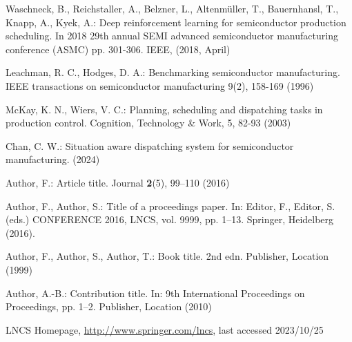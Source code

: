 \begin{thebibliography}{8}
	Waschneck, B., Reichstaller, A., Belzner, L., Altenmüller, T., Bauernhansl, T., Knapp, A., Kyek, A.: Deep reinforcement learning for semiconductor production scheduling. In 2018 29th annual SEMI advanced semiconductor manufacturing conference (ASMC) pp. 301-306. IEEE, (2018, April)
	
	Leachman, R. C., Hodges, D. A.: Benchmarking semiconductor manufacturing. IEEE transactions on semiconductor manufacturing 9(2), 158-169 (1996)
	
	McKay, K. N., Wiers, V. C.: Planning, scheduling and dispatching tasks in production control. Cognition, Technology \& Work, 5, 82-93 (2003)
	
	Chan, C. W.: Situation aware dispatching system for semiconductor manufacturing. (2024)


	Author, F.: Article title. Journal \textbf{2}(5), 99--110 (2016)
	
	Author, F., Author, S.: Title of a proceedings paper. In: Editor,
	F., Editor, S. (eds.) CONFERENCE 2016, LNCS, vol. 9999, pp. 1--13.
	Springer, Heidelberg (2016). 
	
	Author, F., Author, S., Author, T.: Book title. 2nd edn. Publisher,
	Location (1999)
	
	Author, A.-B.: Contribution title. In: 9th International Proceedings
	on Proceedings, pp. 1--2. Publisher, Location (2010)
	
	LNCS Homepage, \url{http://www.springer.com/lncs}, last accessed 2023/10/25
\end{thebibliography}